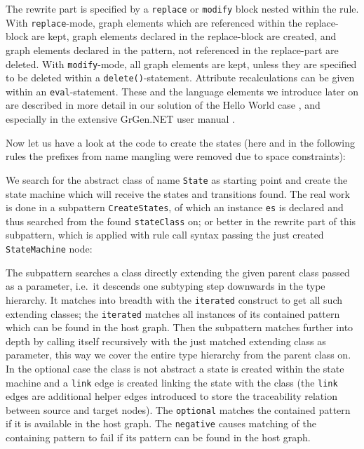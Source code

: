 \documentclass[copyright]{eptcs}
\begin{document}
The rewrite part is specified by a \texttt{replace} or \texttt{modify} block nested within the rule.
With \texttt{replace}-mode, graph elements which are referenced within the replace-block are kept, graph elements declared in the replace-block are created, and graph elements declared in the pattern, not referenced in the replace-part are deleted.
With \texttt{modify}-mode, all graph elements are kept, unless they are specified to be deleted within a \texttt{delete()}-statement.
Attribute recalculations can be given within an \texttt{eval}-statement.
These and the language elements we introduce later on are described in more detail in our solution of the Hello World case \cite{hello},
and especially in the extensive GrGen.NET user manual \cite{GrGenUserManual}.

\noindent Now let us have a look at the code to create the states (here and in the following rules the prefixes from name mangling were removed due to space constraints):



We search for the abstract class of name \texttt{State} as starting point and create the state machine which will receive the states and transitions found.
The real work is done in a subpattern \texttt{CreateStates}, of which an instance \texttt{es} is declared and thus searched from the found \texttt{stateClass} on; or better in the rewrite part of this subpattern, which is applied with rule call syntax passing the just created \texttt{State\-Machine} node:



The subpattern searches a class directly extending the given parent class passed as a parameter,
i.e.\ it descends one subtyping step downwards in the type hierarchy.
It matches into breadth with the \texttt{iterated} construct to get all such extending classes;
the \texttt{iterated} matches all instances of its contained pattern which can be found in the host graph.
Then the subpattern matches further into depth by calling itself recursively with the just matched extending class as parameter, this way we cover the entire type hierarchy from the parent class on.
In the optional case the class is not abstract a state is created within the state machine and a \texttt{link} edge is created linking the state with the class (the \texttt{link} edges are additional helper edges introduced to store the traceability relation between source and target nodes).
The \texttt{optional} matches the contained pattern if it is available in the host graph.
The \texttt{negative} causes matching of the containing pattern to fail if its pattern can be found in the host graph.
\end{document}
